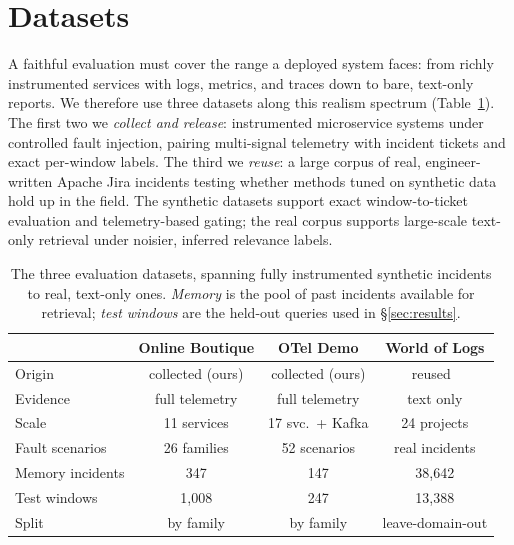 \section{Datasets}
\label{sec:datasets}

A faithful evaluation must cover the range a deployed system faces: from richly instrumented services with logs, metrics, and traces down to bare, text-only reports. We therefore use three datasets along this realism spectrum (Table~\ref{tab:datasets}). The first two we \emph{collect and release}: instrumented microservice systems under controlled fault injection, pairing multi-signal telemetry with incident tickets and exact per-window labels. The third we \emph{reuse}: a large corpus of real, engineer-written Apache Jira incidents testing whether methods tuned on synthetic data hold up in the field. The synthetic datasets support exact window-to-ticket evaluation and telemetry-based gating; the real corpus supports large-scale text-only retrieval under noisier, inferred relevance labels.

\begin{table}[t]
\centering
\caption{The three evaluation datasets, spanning fully instrumented synthetic
incidents to real, text-only ones. \emph{Memory} is the pool of past incidents
available for retrieval; \emph{test windows} are the held-out queries used in
\S\ref{sec:results}.}
\label{tab:datasets}
\footnotesize
\setlength{\tabcolsep}{4pt}
\begin{tabular}{lccc}
\toprule
 & Online Boutique & OTel Demo & World of Logs \\
\midrule
Origin           & collected (ours) & collected (ours) & reused~\cite{wang2026worldoflogs} \\
Evidence         & full telemetry   & full telemetry   & text only \\
Scale            & 11 services      & 17 svc.\ + Kafka & 24 projects \\
Fault scenarios  & 26 families      & 52 scenarios     & real incidents \\
Memory incidents & 347              & 147              & 38{,}642 \\
Test windows     & 1{,}008          & 247              & 13{,}388 \\
Split            & by family        & by family        & leave-domain-out \\
\bottomrule
\end{tabular}
\end{table}

